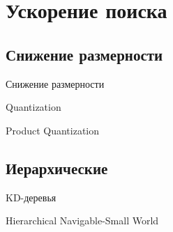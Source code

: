 \section{Ускорение поиска}

\subsection{Снижение размерности}

\begin{frame}{Снижение размерности}
    
\end{frame}

\begin{frame}{Quantization}
    
\end{frame}

\begin{frame}{Product Quantization}
    
\end{frame}

\subsection{Иерархические}

\begin{frame}{KD-деревья}
    
\end{frame}

\begin{frame}{Hierarchical Navigable-Small World}
    
\end{frame}
